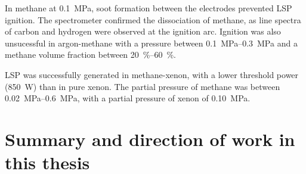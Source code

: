         In methane at \qty{0.1}{MPa}, soot formation between the electrodes prevented LSP ignition. The spectrometer confirmed the dissociation of methane, as line spectra of carbon and hydrogen were observed at the ignition arc. Ignition was also unsucessful in argon-methane with a pressure between \qtyrange{0.1}{0.3}{MPa} and a methane volume fraction between \qtyrange{20}{60}{\%}. 
        
        LSP was successfully generated in methane-xenon, with a lower threshold power (\qty{850}{W}) than in pure xenon. The partial pressure of methane was between \qtyrange{0.02}{0.6}{MPa}, with a partial pressure of xenon of \qty{0.10}{MPa}.

    \section{Summary and direction of work in this thesis}

